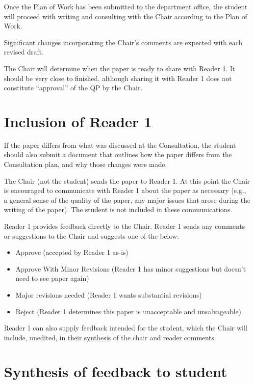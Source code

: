 \documentclass[
]{book}
\providecommand{\tightlist}{%
  \setlength{\itemsep}{0pt}\setlength{\parskip}{0pt}}
\begin{document}
Once the Plan of Work has been submitted to the department office, the student will proceed with writing and consulting with the Chair according to the Plan of Work.

Significant changes incorporating the Chair's comments are expected with each revised draft.

The Chair will determine when the paper is ready to share with Reader 1. It should be very close to finished, although sharing it with Reader 1 does not constitute ``approval'' of the QP by the Chair.

\section{Inclusion of Reader 1}\label{reader1}

If the paper differs from what was discussed at the Consultation, the student should also submit a document that outlines how the paper differs from the Consultation plan, and why those changes were made.

The Chair (not the student) sends the paper to Reader 1. At this point the Chair is encouraged to communicate with Reader 1 about the paper as necessary (e.g., a general sense of the quality of the paper, any major issues that arose during the writing of the paper). The student is not included in these communications.

Reader 1 provides feedback directly to the Chair. Reader 1 sends any comments or suggestions to the Chair and suggests one of the below:

\begin{itemize}
\tightlist
\item
  Approve (accepted by Reader 1 as-is)
\item
  Approve With Minor Revisions (Reader 1 has minor suggestions but doesn't need to see paper again)
\item
  Major revisions needed (Reader 1 wants substantial revisions)
\item
  Reject (Reader 1 determines this paper is unacceptable and unsalvageable)
\end{itemize}

Reader 1 can also supply feedback intended for the student, which the Chair will include, unedited, in their \hyperref[synthesis]{synthesis} of the chair and reader comments.

\section{Synthesis of feedback to student}\label{synthesis}
\end{document}
